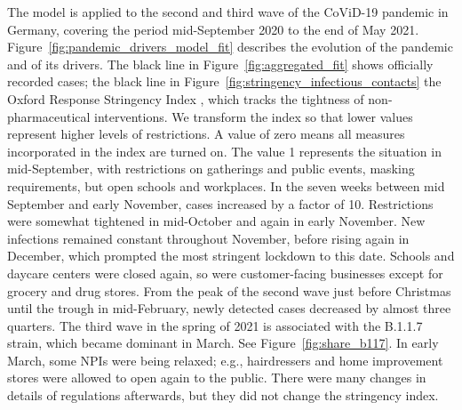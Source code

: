 The model is applied to the second and third wave of the CoViD-19 pandemic in Germany,
covering the period mid-September 2020 to the end of May 2021.
Figure~\ref{fig:pandemic_drivers_model_fit} describes the evolution of the pandemic and
of its drivers. The black line in Figure~\ref{fig:aggregated_fit} shows officially
recorded cases; the black line in Figure~\ref{fig:stringency_infectious_contacts} the Oxford Response
Stringency Index \citep{Hale2020}, which tracks the tightness of non-pharmaceutical
interventions. We transform the index so that lower values represent higher levels of
restrictions. A value of zero means all measures incorporated in the index are turned
on. The value 1 represents the situation in mid-September, with restrictions on
gatherings and public events, masking requirements, but open schools and workplaces. In
the seven weeks between mid September and early November, cases increased by a factor of
10. Restrictions were somewhat tightened in mid-October and again in early November. New
infections remained constant throughout November, before rising again in December, which
prompted the most stringent lockdown to this date. Schools and daycare centers were
closed again, so were customer-facing businesses except for grocery and drug stores.
From the peak of the second wave just before Christmas until the trough in mid-February,
newly detected cases decreased by almost three quarters. The third wave in the spring of
2021 is associated with the B.1.1.7 strain, which became dominant in March. See
Figure~\ref{fig:share_b117}. In early March, some NPIs were being relaxed; e.g.,
hairdressers and home improvement stores were allowed to open again to the public. There
were many changes in details of regulations afterwards, but they did not change the
stringency index.

